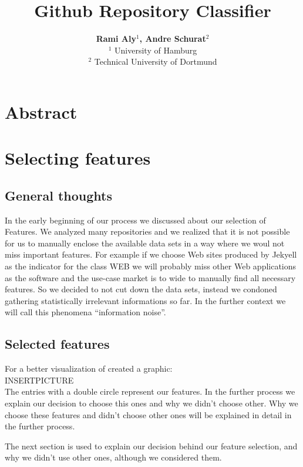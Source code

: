 \documentclass[paper=A4,pagesize=auto,11pt,headinclude=true,footinclude=true,BCOR=0mm,DIV=calc]{scrartcl}
\begin{document}
	
	\title{Github Repository Classifier}
	\author{\textbf{Rami Aly$^{1}$, Andre Schurat}$^{2}$\\
		$^{1}$ University of Hamburg\\
		$^{2}$ Technical University of Dortmund}
	\maketitle
	
	\newpage
	
	\section{Abstract}
	
	
	\newpage
	
	\tableofcontents 
	
	\newpage
	\section{Selecting features} 
	\subsection{General thoughts}
	In the early beginning of our process we discussed about our selection of Features. We analyzed many repositories and  we realized that it is not possible for us to manually enclose the available data sets in a way where we woul not miss important features. For example if we choose Web sites produced by Jekyell as the indicator for the class WEB we will probably miss other Web applications as the software and the use-case market is to wide to manually find all necessary features. So we decided to not cut down the data sets, instead we condoned gathering statistically irrelevant informations so far. In the further context we will call this phenomena “information noise”.
	\subsection{Selected features}
	For a better visualization of  created a graphic:
	\\
	INSERTPICTURE
	\\
	The entries with a double circle represent our features. In the further process we explain our decision to choose this ones and why we didn’t choose other.
	Why we choose these features and didn’t choose other ones will be explained in detail in the further process.
	
	The next section is used to explain our decision behind our feature selection, and why we didn’t use other ones, although we considered them. 
	
\end{document}
